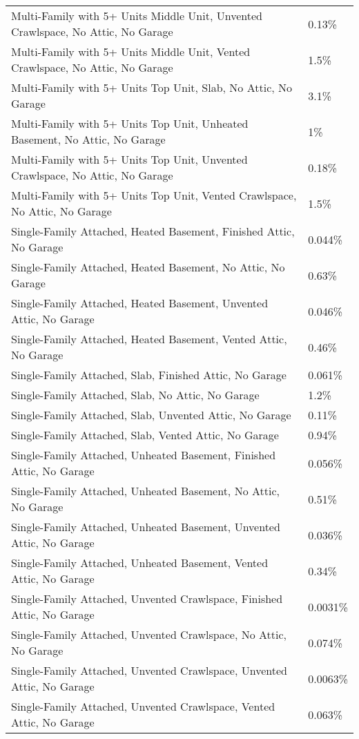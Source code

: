 \begin{longtable}[]{@{}ll@{}}
Multi-Family with 5+ Units Middle Unit, Unvented Crawlspace, No Attic,
No Garage & 0.13\% \\
Multi-Family with 5+ Units Middle Unit, Vented Crawlspace, No Attic, No
Garage & 1.5\% \\
Multi-Family with 5+ Units Top Unit, Slab, No Attic, No Garage &
3.1\% \\
Multi-Family with 5+ Units Top Unit, Unheated Basement, No Attic, No
Garage & 1\% \\
Multi-Family with 5+ Units Top Unit, Unvented Crawlspace, No Attic, No
Garage & 0.18\% \\
Multi-Family with 5+ Units Top Unit, Vented Crawlspace, No Attic, No
Garage & 1.5\% \\
Single-Family Attached, Heated Basement, Finished Attic, No Garage &
0.044\% \\
Single-Family Attached, Heated Basement, No Attic, No Garage & 0.63\% \\
Single-Family Attached, Heated Basement, Unvented Attic, No Garage &
0.046\% \\
Single-Family Attached, Heated Basement, Vented Attic, No Garage &
0.46\% \\
Single-Family Attached, Slab, Finished Attic, No Garage & 0.061\% \\
Single-Family Attached, Slab, No Attic, No Garage & 1.2\% \\
Single-Family Attached, Slab, Unvented Attic, No Garage & 0.11\% \\
Single-Family Attached, Slab, Vented Attic, No Garage & 0.94\% \\
Single-Family Attached, Unheated Basement, Finished Attic, No Garage &
0.056\% \\
Single-Family Attached, Unheated Basement, No Attic, No Garage &
0.51\% \\
Single-Family Attached, Unheated Basement, Unvented Attic, No Garage &
0.036\% \\
Single-Family Attached, Unheated Basement, Vented Attic, No Garage &
0.34\% \\
Single-Family Attached, Unvented Crawlspace, Finished Attic, No Garage &
0.0031\% \\
Single-Family Attached, Unvented Crawlspace, No Attic, No Garage &
0.074\% \\
Single-Family Attached, Unvented Crawlspace, Unvented Attic, No Garage &
0.0063\% \\
Single-Family Attached, Unvented Crawlspace, Vented Attic, No Garage &
0.063\% \\

\end{longtable}
